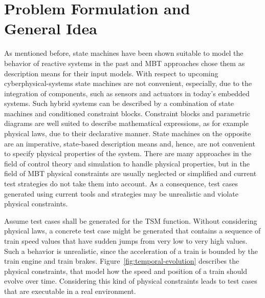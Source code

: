 \section{Problem Formulation and\\ General Idea}
As mentioned before, state machines have been shown suitable to model the behavior of reactive systems in the past and MBT approaches chose them as description means for their input models. With respect to upcoming cyberphysical-systems state machines are not convenient, especially, due to the integration of components, such as sensors and actuators in today's embedded systems. Such hybrid systems can be described by a combination of state machines and conditioned constraint blocks. 
Constraint blocks and parametric diagrams are well suited to describe mathematical expressions, as for example physical laws, due to their declarative manner. State machines on the opposite are an imperative, state-based description means and, hence, are not convenient to specify physical properties of the system. 
There are many approaches in the field of control theory and simulation to handle physical properties, but in the field of MBT physical constraints are usually neglected or simplified and current test strategies do not take them into account. As a consequence, test cases generated using current tools and strategies may be unrealistic and violate physical constraints. 

\begin{example}
Assume test cases shall be generated for the TSM function. Without considering
physical laws, a concrete test case might be generated that contains a
sequence of train speed values that have sudden jumps from very low to very high
values.
Such a behavior is unrealistic, since the acceleration of a train is bounded by
the train engine and train brakes.
Figure~\ref{fig:temporal-evolution} describes the physical constraints, that
model how the speed and position of a train should evolve over time. Considering
this kind of physical constraints leads to test cases that are executable in a
real environment.
\end{example}


